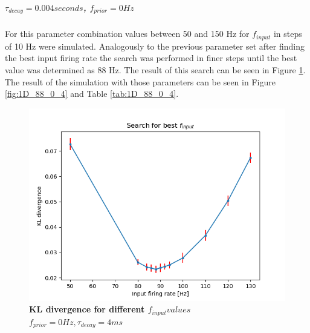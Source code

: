 \subparagraph{$\tau_{decay} = 0.004 seconds$, $f_{prior} = 0 Hz$}
For this parameter combination values between 50 and 150 Hz for $f_{input}$ in steps of 10 Hz were simulated. Analogously to the previous parameter set after finding the best input firing rate the search was performed in finer steps until the best value was determined as 88 Hz. The result of this search can be seen in Figure \ref{fig:1D_KLD_fPrior0_tau4}. The result of the simulation with those parameters can be seen in Figure \ref{fig:1D_88_0_4} and Table \ref{tab:1D_88_0_4}.

\begin{figure}
  \includegraphics[width=\linewidth]{figures/1D/KLDvsfInput_fPrior0tau4.png}
  \caption{\textbf{KL divergence for different $f_{input} values$} $f_{prior} = 0 Hz, \tau_{decay} = 4 ms$}
  \label{fig:1D_KLD_fPrior0_tau4}
\end{figure}

